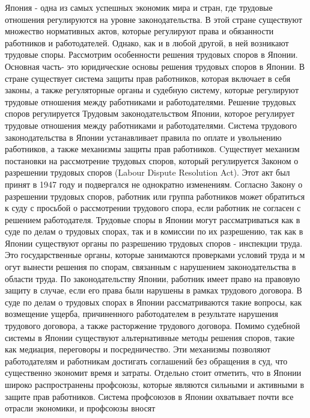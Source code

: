 Япония - одна из самых успешных экономик мира и стран, где трудовые отношения регулируются на уровне законодательства. В этой стране существуют множество нормативных актов, которые регулируют права и обязанности работников и работодателей. Однако, как и в любой другой, в ней возникают трудовые споры. Рассмотрим особенности решения трудовых споров в Японии. Основная часть- это юридические основы решения трудовых споров в Японии. 
В стране существует система защиты прав работников, которая включает в себя законы, 
а также регуляторные органы и судебную систему, 
которые регулируют трудовые отношения между работниками и работодателями. 
Решение трудовых споров регулируется Трудовым законодательством Японии, 
которое регулирует трудовые отношения между работниками и работодателями. 
Система трудового законодательства в Японии устанавливает правила по оплате и 
увольнению работников, а также механизмы защиты прав работников. 
Cуществует механизм постановки на рассмотрение трудовых споров, 
который регулируется Законом о разрешении трудовых споров 
(Labour Dispute Resolution Act).
 Этот акт был принят в 1947 году и подвергался не однократно изменениям. 
 Согласно Закону о разрешении трудовых споров, работник или группа работников может 
 обратиться к суду с просьбой о рассмотрении трудового спора, если работник не согласен 
 с решением работодателя. Трудовые споры в Японии могут рассматриваться как в суде по 
 делам о трудовых спорах, так и в комиссии по их разрешению, так как в Японии 
 существуют органы по разрешению трудовых споров - инспекции труда. 
 Это государственные органы, которые занимаются проверками условий труда и м
огут вынести решения по спорам, связанным с нарушением законодательства в области труда.
  По законодательству Японии, работник имеет право на правовую защиту в случае, 
  если его права были нарушены в рамках трудового договора. В суде по делам о трудовых 
  спорах в Японии рассматриваются такие вопросы, как возмещение ущерба, причиненного 
  работодателем в результате нарушения трудового договора, а также расторжение трудового 
  договора. Помимо судебной системы в Японии существуют альтернативные методы решения 
  споров, такие как медиация, переговоры и посредничество. Эти механизмы позволяют 
  работодателям и работникам достигать соглашений без обращения в суд, что существенно 
  экономит время и затраты. Отдельно стоит отметить, что в Японии широко распространены 
  профсоюзы, которые являются сильными и активными в защите прав работников. 
  Система профсоюзов в Японии охватывает почти все отрасли экономики, и профсоюзы вносят 
